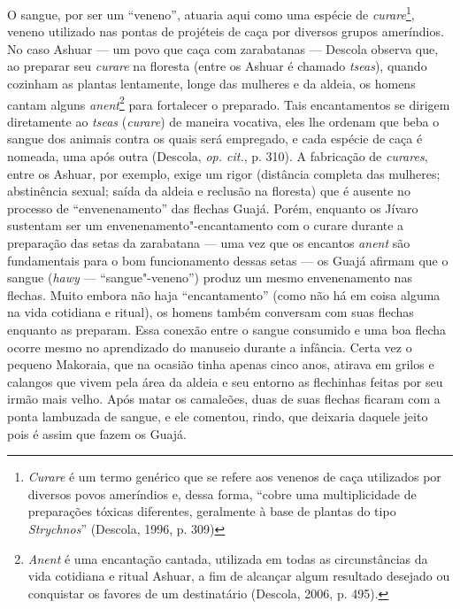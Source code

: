 O sangue, por ser um ``veneno'', atuaria aqui como uma espécie de
\emph{curare}\footnote{\emph{Curare} é um termo genérico que se refere
  aos venenos de caça utilizados por diversos povos ameríndios e, dessa
  forma, ``cobre uma multiplicidade de preparações tóxicas diferentes,
      geralmente à base de plantas do tipo \emph{Strychnos}'' (Descola, 1996, p.
  309)}, veneno utilizado nas pontas de projéteis de caça por diversos
grupos ameríndios. No caso Ashuar --- um povo que caça com zarabatanas ---
Descola observa que, ao preparar seu \emph{curare} na floresta (entre os
Ashuar é chamado \emph{tseas}), quando cozinham as plantas lentamente,
longe das mulheres e da aldeia, os homens cantam alguns
\emph{anent}\footnote{\emph{Anent} é uma encantação cantada, utilizada
  em todas as circunstâncias da vida cotidiana e ritual Ashuar, a fim de
  alcançar algum resultado desejado ou conquistar os favores de um
  destinatário (Descola, 2006, p. 495).} para fortalecer o preparado. Tais
encantamentos se dirigem diretamente ao \emph{tseas} (\emph{curare}) de
maneira vocativa, eles lhe ordenam que beba o sangue dos animais contra
os quais será empregado, e cada espécie de caça é nomeada, uma após
outra (Descola, \emph{op. cit.}, p. 310). A fabricação de \emph{curares}, entre
os Ashuar, por exemplo, exige um rigor (distância completa das mulheres;
abstinência sexual; saída da aldeia e reclusão na floresta) que é
ausente no processo de ``envenenamento'' das flechas Guajá. Porém,
enquanto os Jívaro sustentam ser um envenenamento"-encantamento com o
curare durante a preparação das setas da zarabatana --- uma vez que os
encantos \emph{anent} são fundamentais para o bom funcionamento dessas
setas --- os Guajá afirmam que o sangue (\emph{hawy} --- ``sangue"-veneno'')
produz um mesmo envenenamento nas flechas. Muito embora não haja
``encantamento'' (como não há em coisa alguma na vida cotidiana e ritual),
os homens também conversam com suas flechas enquanto as preparam. Essa
conexão entre o sangue consumido e uma boa flecha ocorre mesmo no
aprendizado do manuseio durante a infância. Certa vez o pequeno
Makoraia, que na ocasião tinha apenas cinco anos, atirava em grilos e
calangos que vivem pela área da aldeia e seu entorno as flechinhas
feitas por seu irmão mais velho. Após matar os camaleões, duas de suas
flechas ficaram com a ponta lambuzada de sangue, e ele comentou, rindo,
que deixaria daquele jeito pois é assim que fazem os Guajá.

